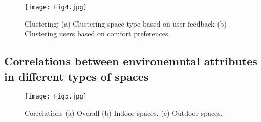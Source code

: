 \begin{figure}
\begin{center}
\texttt{[image: Fig4.jpg]}
\caption{Clustering: (a) Clustering space type based on user feedback (b) Clustering users based on comfort preferences.}
\label{fig:clustering}
\end{center}
\end{figure}




\subsection{Correlations between environemntal attributes in different types of spaces}


\begin{figure}
\begin{center}
\texttt{[image: Fig5.jpg]}
\caption{Correlations (a) Overall (b) Indoor spaces, (c) Outdoor spaces.}
\label{fig:Clustering}
\end{center}
\end{figure}



